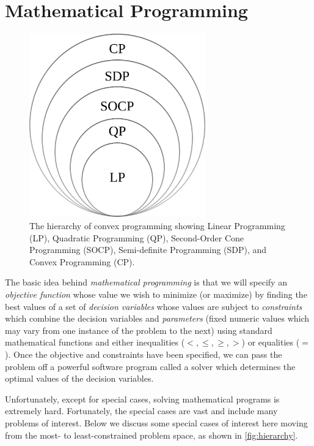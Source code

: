 \documentclass{article}
\begin{document}

\section{Mathematical Programming}
\label{sec:mathprog}

\begin{figure}
\centering
\includegraphics[width=3in]{imgs/hierarchy-of-convex-programs.png}
\caption{The hierarchy of convex programming showing Linear Programming (LP), Quadratic Programming (QP), Second-Order Cone Programming (SOCP), Semi-definite Programming (SDP), and Convex Programming (CP). \label{fig:hierarchy}}
\end{figure}

The basic idea behind \textit{mathematical programming} is that we will specify an \textit{objective function} whose value we wish to minimize (or maximize) by finding the best values of a set of \textit{decision variables} whose values are subject to \textit{constraints} which combine the decision variables and \textit{parameters} (fixed numeric values which may vary from one instance of the problem to the next) using standard mathematical functions and either inequalities ($<,\le,\ge,>$) or equalities ($=$). Once the objective and constraints have been specified, we can pass the problem off a powerful software program called a solver which determines the optimal values of the decision variables.

Unfortunately, except for special cases, solving mathematical programs is extremely hard. Fortunately, the special cases are vast and include many problems of interest. Below we discuss some special cases of interest here moving from the most- to least-constrained problem space, as shown in \autoref{fig:hierarchy}.
\end{document}
